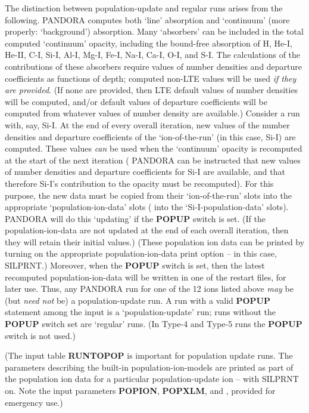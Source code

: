 The distinction between population-update and regular runs arises from the
following. PANDORA computes both `line' absorption and `continuum'
(more properly: `background') absorption. Many `absorbers' can be included
in the total computed `continuum' opacity, including the bound-free
absorption of H, He-I, He-II, C-I, Si-I, Al-I, Mg-I, Fe-I, Na-I, Ca-I,
O-I, and S-I.
The calculations of the contributions of these absorbers require values
of number densities and departure coefficients as functions of depth;
computed non-LTE values will be used {\it if they are provided}.
(If none are provided, then LTE default values of number densities will
be computed, and/or default values of departure coefficients will be
computed from whatever values of number density are available.)
Consider a run with, say, Si-I.
At the end of every overall iteration, new values of the number
densities and departure coefficients of the `ion-of-the-run' (in this
case, Si-I) are computed. These values {\it can} be used when the
`continuum' opacity is recomputed at the start of 
the next iteration ({\ie} PANDORA
can be instructed that new values of number densities and departure
coefficients for Si-I are available, and that therefore Si-I's contribution
to the opacity must be recomputed). For this purpose, the new data
must be copied from their `ion-of-the-run' slots into the appropriate
`population-ion-data' slots ({\ie} into the `Si-I-population-data'
slots). PANDORA will do this `updating' if the {\bf POPUP} switch is set.
(If the population-ion-data are not updated at the end of each overall
iteration, then they will retain their initial values.) 
(These population ion data
can be printed by turning on the appropriate population-ion-data
print option -- in this case, SILPRNT.) Moreover, when the
{\bf POPUP} switch is set, then the latest recomputed population-ion-data
will be written in one of the restart files, for later use. Thus, any
PANDORA run for one of the 12 ions listed above {\it may} be
(but {\it need not} be) a population-update run. A run with a valid
{\bf POPUP} statement among the input is a `population-update' run;
runs without the {\bf POPUP} switch set are `regular' runs. (In Type-4
and Type-5 runs the {\bf POPUP} switch is not used.)

(The input table {\bf RUNTOPOP} is important for population update runs.
The parameters describing the built-in population-ion-models are printed
as part of the population ion data for a particular population-update ion -- 
{\eg} with \break SILPRNT on. Note the input parameters {\bf POPION}, 
{\bf POPXLM}, and , provided for emergency use.)

